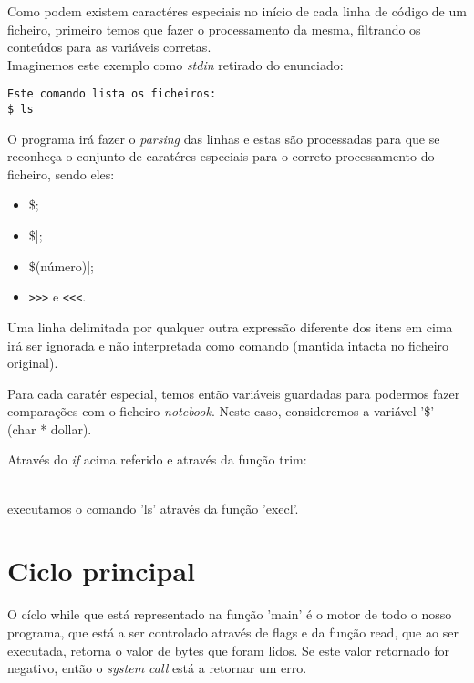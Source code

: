 \documentclass[11pt,a4paper]{report}
\begin{document}
Como podem existem caractéres especiais no início de cada linha de código de um ficheiro, primeiro temos que fazer o processamento da mesma, filtrando os conteúdos para as variáveis corretas.
~\\

Imaginemos este exemplo como \textit{stdin} retirado do enunciado:
\begin{verbatim}
Este comando lista os ficheiros:
$ ls
\end{verbatim}

O programa irá fazer o \textit{parsing} das linhas e estas são processadas para que se reconheça o conjunto de caratéres especiais para o correto processamento do ficheiro, sendo eles:

\begin{itemize}
\item \$; 
\item \$|;
\item \$(número)|;
\item \verb|>>>| e \verb|<<<|.
\end{itemize}

Uma linha delimitada por qualquer outra expressão diferente dos itens em cima irá ser ignorada e não interpretada como comando (mantida intacta no ficheiro original).

Para cada caratér especial, temos então variáveis guardadas para podermos fazer comparações com o ficheiro \textit{notebook}. Neste caso, consideremos a variável '\$' (char * dollar).




Através do \textit{if} acima referido e através da função trim:

 ~\\

executamos o comando 'ls' através da função 'execl'.


\section{Ciclo principal}

O cíclo while que está representado na função 'main' é o motor de todo o nosso programa, que está a ser controlado através de flags e da função read, que ao ser executada, retorna o valor de bytes que foram lidos. Se este valor retornado for negativo, então o \textit{system call} está a retornar um erro. 
\end{document}
